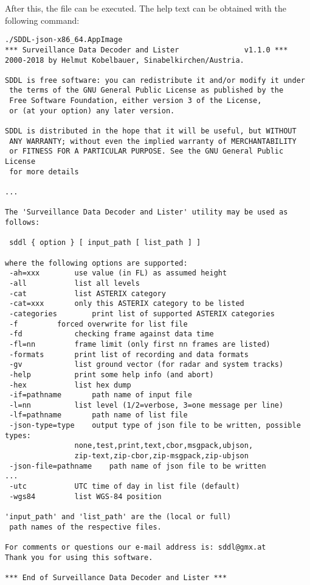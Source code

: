 After this, the file can be executed. The help text can be obtained with the following command:
\begin{lstlisting}
./SDDL-json-x86_64.AppImage
*** Surveillance Data Decoder and Lister			   v1.1.0 ***
2000-2018 by Helmut Kobelbauer, Sinabelkirchen/Austria.

SDDL is free software: you can redistribute it and/or modify it under
 the terms of the GNU General Public License as published by the 
 Free Software Foundation, either version 3 of the License, 
 or (at your option) any later version.

SDDL is distributed in the hope that it will be useful, but WITHOUT
 ANY WARRANTY; without even the implied warranty of MERCHANTABILITY 
 or FITNESS FOR A PARTICULAR PURPOSE. See the GNU General Public License
 for more details

...

The 'Surveillance Data Decoder and Lister' utility may be used as follows:

 sddl { option } [ input_path [ list_path ] ]

where the following options are supported:
 -ah=xxx		use value (in FL) as assumed height
 -all			list all levels
 -cat			list ASTERIX category
 -cat=xxx		only this ASTERIX category to be listed
 -categories		print list of supported ASTERIX categories
 -f			forced overwrite for list file
 -fd			checking frame against data time
 -fl=nn			frame limit (only first nn frames are listed)
 -formats		print list of recording and data formats
 -gv			list ground vector (for radar and system tracks)
 -help			print some help info (and abort)
 -hex			list hex dump
 -if=pathname		path name of input file
 -l=nn			list level (1/2=verbose, 3=one message per line)
 -lf=pathname		path name of list file
 -json-type=type	output type of json file to be written, possible types: 
                none,test,print,text,cbor,msgpack,ubjson,
                zip-text,zip-cbor,zip-msgpack,zip-ubjson
 -json-file=pathname	path name of json file to be written
...
 -utc			UTC time of day in list file (default)
 -wgs84			list WGS-84 position

'input_path' and 'list_path' are the (local or full)
 path names of the respective files.

For comments or questions our e-mail address is: sddl@gmx.at
Thank you for using this software.

*** End of Surveillance Data Decoder and Lister ***
\end{lstlisting}


